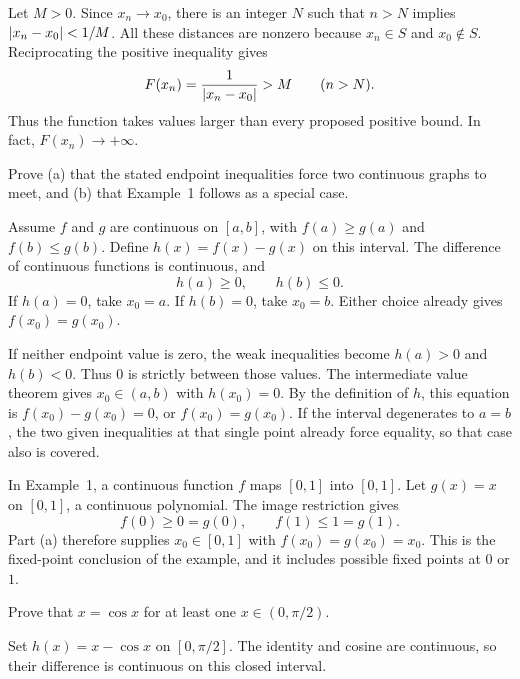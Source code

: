 Let $M>0$. Since $x_n\to x_0$, there is an integer $N$ such
that $n>N$ implies $\left|x_n-x_0\right|<1/M$. All these distances
are nonzero because $x_n\in S$ and $x_0\notin S$.
Reciprocating the positive inequality gives
\[
 F(x_n)=\frac1{\left|x_n-x_0\right|}>M\qquad(n>N).
\]
Thus the function takes values larger than every proposed positive
bound. In fact, $F(x_n)\to+\infty$.

\goal Prove (a) that the stated endpoint inequalities force
two continuous graphs to meet, and (b) that Example~1 follows
as a special case.

Assume $f$ and $g$ are continuous on $[a,b]$, with
$f(a)\ge g(a)$ and $f(b)\le g(b)$.
Define $h(x)=f(x)-g(x)$ on this interval. The difference of
continuous functions is continuous, and
\[
 h(a)\ge0,\qquad h(b)\le0.
\]
If $h(a)=0$, take $x_0=a$. If $h(b)=0$, take $x_0=b$.
Either choice already gives $f(x_0)=g(x_0)$.

If neither endpoint value is zero, the weak inequalities become
$h(a)>0$ and $h(b)<0$. Thus $0$ is strictly between those values.
The intermediate value theorem gives $x_0\in(a,b)$ with
$h(x_0)=0$. By the definition of $h$, this equation is
$f(x_0)-g(x_0)=0$, or $f(x_0)=g(x_0)$.
If the interval degenerates to $a=b$, the two given inequalities
at that single point already force equality, so that case also
is covered.

In Example~1, a continuous function $f$ maps $[0,1]$ into
$[0,1]$. Let $g(x)=x$ on $[0,1]$, a continuous polynomial.
The image restriction gives
\[
 f(0)\ge0=g(0),\qquad f(1)\le1=g(1).
\]
Part (a) therefore supplies $x_0\in[0,1]$ with
$f(x_0)=g(x_0)=x_0$. This is the fixed-point conclusion of
the example, and it includes possible fixed points at $0$ or $1$.

\goal Prove that $x=\cos x$ for at least one
$x\in(0,\pi/2)$.

Set $h(x)=x-\cos x$ on $[0,\pi/2]$.
The identity and cosine are continuous, so their difference is
continuous on this closed interval.

